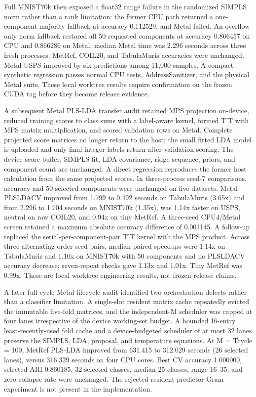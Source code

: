 \documentclass[twoside,11pt]{article}
\begin{document}
\begin{small}
Full MNIST70k then exposed a float32 range failure in the randomized SIMPLS norm rather than a rank limitation: the former CPU path returned a one-component majority fallback at accuracy 0.112529, and Metal failed. An overflow-only norm fallback restored all 50 requested components at accuracy 0.866457 on CPU and 0.866286 on Metal; median Metal time was 2.296 seconds across three fresh processes. MetRef, COIL20, and TabulaMuris accuracies were unchanged; Metal USPS improved by six predictions among 11,000 samples. A compact synthetic regression passes normal CPU tests, AddressSanitizer, and the physical Metal suite. These local worktree results require confirmation on the frozen CUDA tag before they become release evidence.

A subsequent Metal PLS-LDA transfer audit retained MPS projection on-device, reduced training scores to class sums with a label-aware kernel, formed T'T with MPS matrix multiplication, and scored validation rows on Metal. Complete projected score matrices no longer return to the host; the small fitted LDA model is uploaded and only final integer labels return after validation scoring. The device score buffer, SIMPLS fit, LDA covariance, ridge sequence, priors, and component count are unchanged. A direct regression reproduces the former host calculation from the same projected scores. In three-process seed-7 comparisons, accuracy and 50 selected components were unchanged on five datasets. Metal PLSLDACV improved from 1.799 to 0.492 seconds on TabulaMuris (3.65x) and from 2.296 to 1.704 seconds on MNIST70k (1.35x), was 1.14x faster on USPS, neutral on raw COIL20, and 0.94x on tiny MetRef. A three-seed CPU4/Metal screen retained a maximum absolute accuracy difference of 0.001145. A follow-up replaced the serial-per-component-pair T'T kernel with the MPS product. Across three alternating-order seed pairs, median paired speedups were 1.14x on TabulaMuris and 1.10x on MNIST70k with 50 components and no PLSLDACV accuracy decrease; seven-repeat checks gave 1.13x and 1.01x. Tiny MetRef was 0.99x. These are local worktree engineering results, not frozen release claims.

A later full-cycle Metal lifecycle audit identified two orchestration defects rather than a classifier limitation. A single-slot resident matrix cache repeatedly evicted the immutable five-fold matrices, and the independent-M scheduler was capped at four lanes irrespective of the device working-set budget. A bounded 16-entry least-recently-used fold cache and a device-budgeted scheduler of at most 32 lanes preserve the SIMPLS, LDA, proposal, and temperature equations. At M = Tcycle = 100, MetRef PLS-LDA improved from 631.415 to 312.029 seconds (26 selected lanes), versus 316.329 seconds on four CPU cores. Best CV accuracy 1.000000, selected ARI 0.860185, 32 selected classes, median 25 classes, range 16--35, and zero collapse rate were unchanged. The rejected resident predictor-Gram experiment is not present in the implementation.


\end{small}
\end{document}
